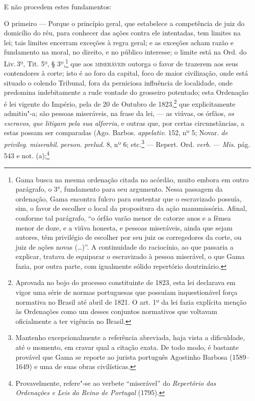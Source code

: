 E não procedem estes fundamentos:

O primeiro --- Porque o princípio geral, que estabelece a competência
de juiz do domicílio do réu, para conhecer das ações contra ele
intentadas, tem limites na lei; tais limites encerram exceções à regra
geral; e as exceções acham razão e fundamento na moral, no direito, e no
público interesse; o limite está na Ord. do Liv.\,3º, Tit. 5º, §
3º,\footnote{Gama busca na mesma ordenação citada no acórdão, muito
  embora em outro parágrafo, o 3°, fundamento para seu argumento. Nessa
  passagem da ordenação, Gama encontra fulcro para sustentar que o
  escravizado possuía, sim, o favor de escolher o local da propositura
  da ação manumissória. Afinal, conforme tal parágrafo, ``o órfão varão
  menor de catorze anos e a fêmea menor de doze, e a viúva honesta, e
  pessoas miseráveis, ainda que sejam autores, têm privilégio de
  escolher por seu juiz os corregedores da corte, ou juiz de ações novas
  (\ldots{})''. A continuidade do raciocínio, ao que passaria a explicar,
  tratava de equiparar o escravizado à pessoa miserável, o que Gama
  fazia, por outra parte, com igualmente sólido repertório doutrinário.}
que aos \textsc{miseráveis} outorga o favor de trazerem aos seus contendores à
corte; isto é ao foro da capital, foco de maior civilização, onde está
situado o colendo Tribunal, fora da perniciosa influência de localidade,
onde predomina indebitamente a rude vontade do grosseiro potentado; esta
Ordenação é lei vigente do Império, pela de 20 de Outubro de
1823,\footnote{Aprovada no bojo do processo constituinte de 1823, esta
  lei declarava em vigor uma série de normas portuguesas que possuíam
  inquestionável força normativa no Brasil até abril de 1821. O art. 1º
  da lei fazia explícita menção às Ordenações como um desses conjuntos
  normativos que voltavam oficialmente a ter vigência no Brasil.} que
explicitamente admitiu"-a; são pessoas miseráveis, na frase da lei, ---
as viúvas, os órfãos, \emph{os escravos}, \emph{que litigam pela sua
alforria}, e outras que, por certas circunstâncias, a estas possam ser
comparadas (Ago. Barbos. \emph{appelativ}. 152, nº 5; Novar. \emph{de
privileg}. \emph{miserabil}. \emph{person}. \emph{prelud}. 8, nº 6;
etc.\footnote{Mantenho excepcionalmente a referência abreviada, haja
  vista a dificuldade, até o momento, em cravar qual a citação exata. De
  todo modo, é bastante provável que Gama se reporte ao jurista
  português Agostinho Barbosa (1589--1649) e uma de suas obras
  civilísticas.} --- Repert. Ord. \emph{verb}. --- \emph{Mis}. pág. 543 e
not. (a);\footnote{Provavelmente, refere"-se ao verbete ``miserável'' do
  \emph{Repertório das Ordenações e Leis do Reino de Portugal} (1795).}
